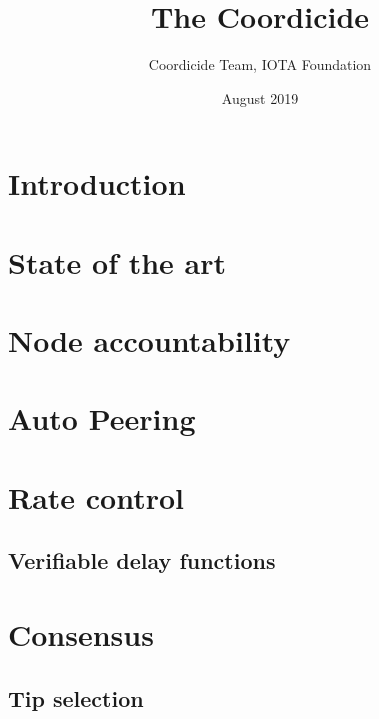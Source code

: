 \documentclass{article}
\title{The Coordicide}
\author{Coordicide Team, IOTA Foundation}
\date{August 2019}
\begin{document}
\maketitle

{\small
\tableofcontents
}
\clearpage

\glsaddall
\printglossary[nonumberlist, nogroupskip=true]\label{sec:glossary}
\printacronyms[nonumberlist, nogroupskip=true]
\clearpage

\section{Introduction}


\section{State of the art}\label{sec:cliri}


\section{Node accountability}\label{sec:node_acc}


\section{Auto Peering}\label{sec:peering}


\section{Rate control}\label{sec:rate_control}


\subsection{Verifiable delay functions}


\section{Consensus}\label{sec:consensus}


\subsection{Tip selection}\label{sec:tsa}

\end{document}
